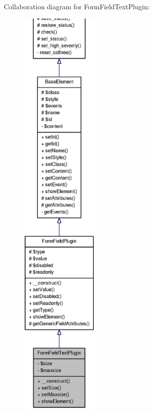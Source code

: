 Collaboration diagram for FormFieldTextPlugin:\nopagebreak
\begin{figure}[H]
\begin{center}
\leavevmode
\includegraphics[height=600pt]{classFormFieldTextPlugin__coll__graph}
\end{center}
\end{figure}
